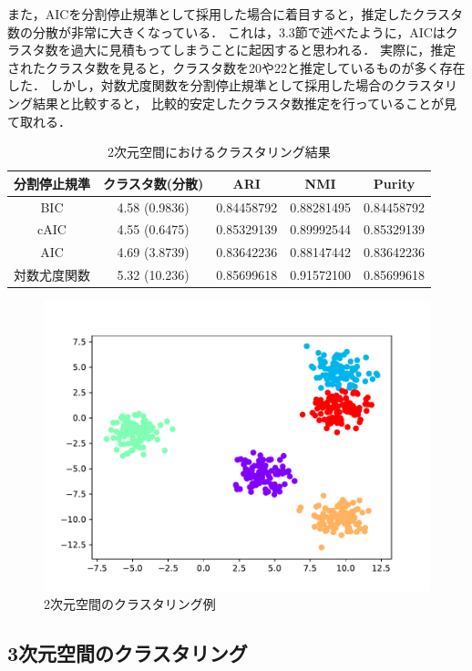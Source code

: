 また，AICを分割停止規準として採用した場合に着目すると，推定したクラスタ数の分散が非常に大きくなっている．
これは，3.3節で述べたように，AICはクラスタ数を過大に見積もってしまうことに起因すると思われる．
実際に，推定されたクラスタ数を見ると，クラスタ数を20や22と推定しているものが多く存在した．
しかし，対数尤度関数を分割停止規準として採用した場合のクラスタリング結果と比較すると，
比較的安定したクラスタ数推定を行っていることが見て取れる．

\begin{table}[htb]
  \centering
  \caption{2次元空間におけるクラスタリング結果}
  \label{table:2dim}
  \begin{tabular}{|c|c|c|c|c|} \hline
    分割停止規準 & クラスタ数(分散) & ARI & NMI & Purity \\\hline
    BIC & 4.58 (0.9836) & 0.84458792 & 0.88281495 & 0.84458792\\
    cAIC & 4.55 (0.6475) & 0.85329139 & 0.89992544 & 0.85329139\\
    AIC & 4.69 (3.8739) & 0.83642236 & 0.88147442 & 0.83642236\\
    対数尤度関数 & 5.32 (10.236) & 0.85699618 & 0.91572100 & 0.85699618\\\hline
  \end{tabular}
\end{table}

\begin{figure}[htbp]
  \begin{center}
    \includegraphics[width=0.7\linewidth]{./img/BIC_2.pdf}
      \caption{2次元空間のクラスタリング例}
      \label{fig:2dim}
  \end{center}
\end{figure}

\subsection{3次元空間のクラスタリング}

